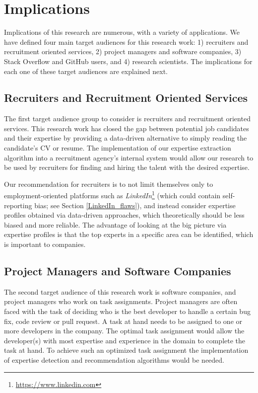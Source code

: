     \section{Implications\label{sec:implications}}
    
        Implications of this research are numerous, with a variety of applications. We have defined four main target audiences for this research work: 1) recruiters and recruitment oriented services, 2) project managers and software companies, 3) Stack Overflow and GitHub users, and 4) research scientists. The implications for each one of these target audiences are explained next. 
        
        \subsection{Recruiters and Recruitment Oriented Services}
        
            The first target audience group to consider is recruiters and recruitment oriented services. This research work has closed the gap between potential job candidates and their expertise by providing a data-driven alternative to simply reading the candidate's CV or resume. The implementation of our expertise extraction algorithm into a recruitment agency's internal system would allow our research to be used by recruiters for finding and hiring the talent with the desired expertise. 
            
            Our recommendation for recruiters is to not limit themselves only to employment-oriented platforms such as \emph{LinkedIn}\footnote{\url{https://www.linkedin.com}} (which could contain self-reporting bias; see Section \ref{LinkedIn_flaws}), and instead consider expertise profiles obtained via data-driven approaches, which theoretically should be less biased and more reliable. The advantage of looking at the big picture via expertise profiles is that the top experts in a specific area can be identified, which is important to companies.
            
        \subsection{Project Managers and Software Companies}
        
            The second target audience of this research work is software companies, and project managers who work on task assignments. Project managers are often faced with the task of deciding who is the best developer to handle a certain bug fix, code review or pull request. A task at hand needs to be assigned to one or more developers in the company. The optimal task assignment would allow the developer(s) with most expertise and experience in the domain to complete the task at hand. To achieve such an optimized task assignment the implementation of expertise detection and recommendation algorithms would be needed. 
            
